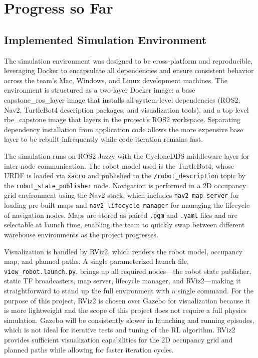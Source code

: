 \documentclass[conference]{IEEEtran}
\begin{document}
\section{Progress so Far}
    \subsection{Implemented Simulation Environment}
    The simulation environment was designed to be cross-platform and reproducible, leveraging Docker to encapsulate all dependencies and ensure consistent behavior across the team's Mac, Windows, and Linux development machines. The environment is structured as a two-layer Docker image: a base capstone\_ros\_layer image that installs all system-level dependencies (ROS2, Nav2, TurtleBot4 description packages, and visualization tools), and a top-level rbe\_capstone image that layers in the project's ROS2 workspace. Separating dependency installation from application code allows the more expensive base layer to be rebuilt infrequently while code iteration remains fast.

    The simulation runs on ROS2 Jazzy with the CycloneDDS middleware layer for inter-node communication. The robot model used is the TurtleBot4, whose URDF is loaded via \texttt{xacro} and published to the \texttt{/robot\_description} topic by the \texttt{robot\_state\_publisher} node. Navigation is performed in a 2D occupancy grid environment using the Nav2 stack, which includes \texttt{nav2\_map\_server} for loading pre-built maps and \texttt{nav2\_lifecycle\_manager} for managing the lifecycle of navigation nodes. Maps are stored as paired \texttt{.pgm} and \texttt{.yaml} files and are selectable at launch time, enabling the team to quickly swap between different warehouse environments as the project progresses.

    Visualization is handled by RViz2, which renders the robot model, occupancy map, and planned paths. A single parameterized launch file, \texttt{view\_robot.launch.py}, brings up all required nodes---the robot state publisher, static TF broadcasters, map server, lifecycle manager, and RViz2---making it straightforward to stand up the full environment with a single command. For the purpose of this project, RViz2 is chosen over Gazebo for visualization because it is more lightweight and the scope of this project does not require a full physics simulation. Gazebo will be consistently slower in launching and running episodes, which is not ideal for iterative tests and tuning of the RL algorithm. RViz2 provides sufficient visualization capabilities for the 2D occupancy grid and planned paths while allowing for faster iteration cycles.
\end{document}
